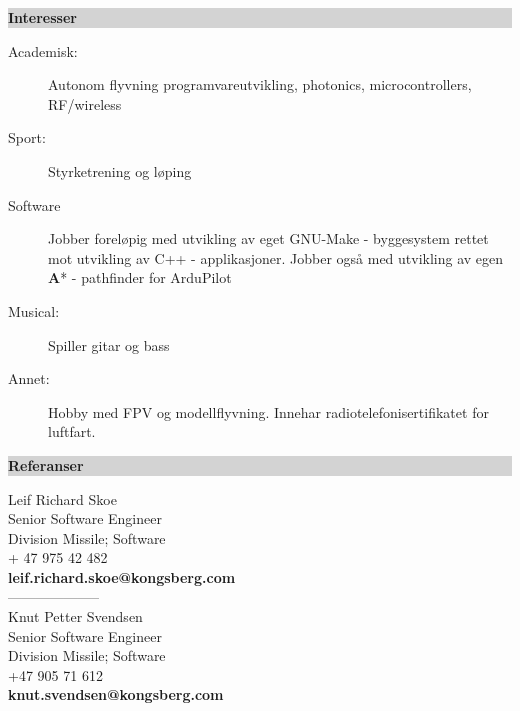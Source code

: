 \documentclass[letterpaper,11pt]{article}
\newcommand{\resheading}[1]{{\large \noindent\colorbox{lightgray}{\begin{minipage}{\linewidth-2\fboxsep}{\textbf{#1}}\end{minipage}}}}%
\begin{document}
\resheading{Interesser}

\begin{description}
\item[Academisk:] Autonom flyvning  programvareutvikling, photonics, microcontrollers, RF/wireless
\item[Sport:] Styrketrening og løping
\item[Software] Jobber foreløpig med utvikling av eget GNU-Make - byggesystem rettet mot utvikling av C++ - applikasjoner. Jobber også med utvikling av egen \textbf{A}* - pathfinder for ArduPilot
\item[Musical:] Spiller gitar og bass
\item[Annet:] Hobby med FPV og modellflyvning. Innehar radiotelefonisertifikatet for luftfart.
\end{description}

\resheading{Referanser}
Leif Richard Skoe \\
Senior Software Engineer \\
Division Missile; Software \\
+ 47 975 42 482 \\
\textbf{leif.richard.skoe@kongsberg.com} \\
-------------------- \\
Knut Petter Svendsen \\
Senior Software Engineer \\
Division Missile; Software \\
+47 905 71 612 \\
\textbf{knut.svendsen@kongsberg.com \\}
\end{document}
